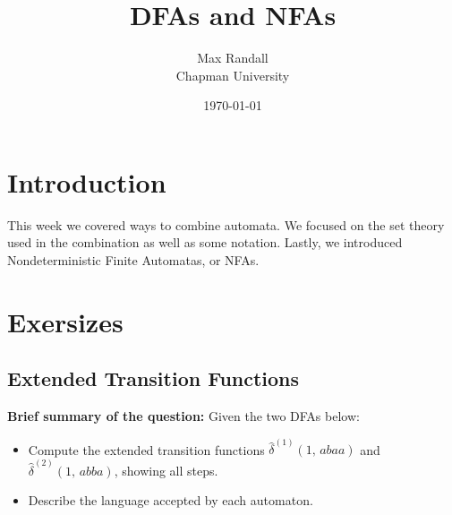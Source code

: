 \documentclass{article}
\title{DFAs and NFAs}
\author{Max Randall \\ Chapman University}
\date{\today}
\theoremstyle{theorem}
\theoremstyle{definition}
\theoremstyle{remark}
\begin{document}
\maketitle

\setcounter{tocdepth}{3}
\tableofcontents

\section{Introduction}\label{sec:intro}
This week we covered ways to combine automata. We focused on the set theory used in the combination as well as some notation.
Lastly, we introduced Nondeterministic Finite Automatas, or NFAs.
\newpage
\section{Exersizes}\label{sec:week-by-week}

\subsection{Extended Transition Functions}
\textbf{Brief summary of the question:}
Given the two DFAs below:
\begin{itemize}
  \item Compute the extended transition functions 
    \(\hat\delta^{(1)}(1,\,abaa)\) and \(\hat\delta^{(2)}(1,\,abba)\), 
    showing all steps.
  \item Describe the language accepted by each automaton.
\end{itemize}
\end{document}
